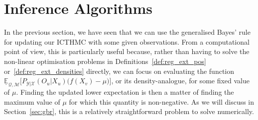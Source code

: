 \documentclass[twoside,11pt]{article}
\newcommand{\reals}{\mathbb{R}}
\newcommand{\states}{\mathcal{X}}
\newcommand{\observs}{\mathcal{Y}}
\newcommand{\lexp}{\underline{\mathbb{E}}_{\rateset,\mathcal{M}}}
\newcommand{\gambles}{\mathcal{L}}
\newcommand{\rateset}{\mathcal{Q}}
\begin{document}
%

\section{Inference Algorithms}\label{sec:inference_algos}

In the previous section, we have seen that we can use the generalised Bayes' rule for updating our ICTHMC with some given observations. From a computational point of view, this is particularly useful because, rather than having to solve the non-linear optimisation problems %
in Definitions~\ref{def:reg_ext_pos} or~\ref{def:reg_ext_densities} directly, 
we can focus on evaluating the function $\lexp\bigl[P_{\observs\vert\states}(O_u\vert X_u)\bigl(f(X_v) - \mu\bigr)\bigr]$,
or its density-analogue, for some fixed value of $\mu$. Finding the updated lower expectation is then a matter of finding the maximum value of $\mu$ for which this quantity is non-negative. As we will discuss in Section~\ref{sec:gbr}, this is a relatively straightforward problem to solve numerically.
\end{document}
